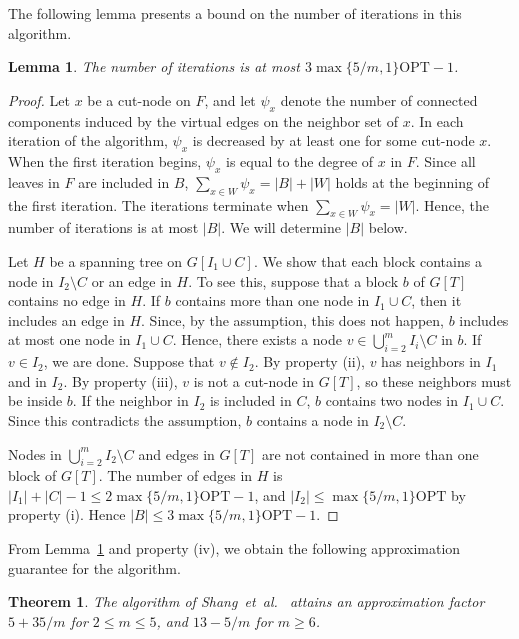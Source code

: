 \documentclass[11pt]{article}
\newcommand{\opt}{\mathrm{OPT}}
\newtheorem{theorem}{Theorem}
\newtheorem{lemma}{Lemma}
\begin{document}
  The following lemma presents a bound on the number of iterations in this algorithm.
 
 \begin{lemma}\label{lem.iterationfor2}
  The number of iterations is at most
  $3\max\{5/m,1\}\opt-1$.
 \end{lemma}
   \begin{proof}
    Let $x$ be a cut-node on $F$,
    and let $\psi_x$ denote the 
    number of connected components 
    induced by the virtual edges
    on the neighbor set of $x$.
    In each iteration of the algorithm,
    $\psi_x$ is decreased by at least one
    for some cut-node $x$.
    When the first iteration begins,
    $\psi_x$ is equal to the degree of $x$ in $F$.
    Since all leaves in $F$ are included in $B$,
    $\sum_{x \in W} \psi_x=|B|+|W|$ holds at the beginning of the first iteration.
    The iterations terminate when
    $\sum_{x \in W} \psi_x=|W|$.
    Hence,
    the number of iterations is at most $|B|$.
    We will determine $|B|$ below.

    Let $H$ be a spanning tree on $G[I_1 \cup C]$.
    We show that each block contains a node in
    $I_2\setminus C$
    or an edge in $H$.
    To see this, suppose that a block $b$ of $G[T]$ contains 
    no edge in $H$.
    If $b$ contains more than one node in $I_1 \cup C$,
    then it includes an edge in $H$.
    Since, by the assumption, this does not happen, $b$ includes
    at most one node in $I_1 \cup C$.
    Hence, there exists a node 
    $v \in \bigcup_{i=2}^m I_i \setminus C$ in $b$.
    If $v \in I_2$, we are done. Suppose that $v \not\in I_2$.
    By property (ii),
    $v$ has neighbors in $I_1$ and in $I_2$.
    By property (iii), $v$ is not a cut-node in $G[T]$, so
    these neighbors must be inside $b$.
    If the neighbor in $I_2$ is included in $C$,
    $b$ contains two nodes in $I_1 \cup C$.
    Since this contradicts the assumption, $b$
    contains a node in $I_2\setminus C$.

    Nodes in $\bigcup_{i=2}^m I_2 \setminus C$ and edges in $G[T]$ are
    not contained in more than one block of $G[T]$.
   The number of edges in $H$ is $|I_1| + |C|-1 \leq
   2\max\{5/m,1\}\opt-1$,
    and $|I_2| \leq \max\{5/m,1\}\opt$ by property (i).
    Hence $|B| \leq 3\max\{5/m,1\}\opt-1$.
   \end{proof} 

  From Lemma~\ref{lem.iterationfor2} and property (iv), we obtain the following
  approximation guarantee for the algorithm.
  \begin{theorem}
   The algorithm of Shang~et~al.\ \cite{Shang:2007jg}
   attains an approximation factor
   $5+35/m$ for $2 \leq m \leq 5$, and 
   $13-5/m$ for $m\geq 6$.
  \end{theorem}



  
\end{document}
